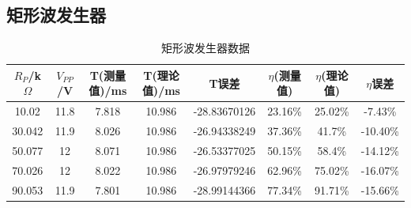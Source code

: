 \documentclass[a4paper]{article}
\begin{document}
\subsection{矩形波发生器}%
\begin{table}[!h]
\centering
\caption{矩形波发生器数据}
\label{data2}
\begin{tabular}{|c|c|c|c|c|c|c|c|}
\hline
$R_P$/k$\Omega$ & $V_{PP}$/V & T(测量值)/ms & T(理论值)/ms & T误差    & $\eta$(测量值) & $\eta$(理论值) & $\eta$误差    \\ \hline
10.02           & 11.8          & 7.818     & 10.986    & -28.83670126 & 23.16\%      & 25.02\%      & -7.43\%  \\ \hline
30.042          & 11.9          & 8.026     & 10.986    & -26.94338249 & 37.36\%      & 41.7\%       & -10.40\% \\ \hline
50.077          & 12            & 8.071     & 10.986    & -26.53377025 & 50.15\%      & 58.4\%       & -14.12\% \\ \hline
70.026          & 12            & 8.022     & 10.986    & -26.97979246 & 62.96\%      & 75.02\%      & -16.07\% \\ \hline
90.053          & 11.9          & 7.801     & 10.986    & -28.99144366 & 77.34\%      & 91.71\%      & -15.66\% \\ \hline
\end{tabular}
\end{table}
\end{document}
